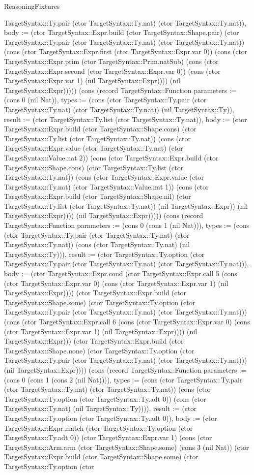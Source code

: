 \begin{lexlean}{ReasoningFixtures}
\begin{semanticmodule}
{TargetSyntax::Ty.pair (ctor TargetSyntax::Ty.nat) (ctor TargetSyntax::Ty.nat)), body := (ctor TargetSyntax::Expr.build (ctor TargetSyntax::Shape.pair) (ctor TargetSyntax::Ty.pair (ctor TargetSyntax::Ty.nat) (ctor TargetSyntax::Ty.nat)) (cons (ctor TargetSyntax::Expr.first (ctor TargetSyntax::Expr.var 0)) (cons (ctor TargetSyntax::Expr.prim (ctor TargetSyntax::Prim.natSub) (cons (ctor TargetSyntax::Expr.second (ctor TargetSyntax::Expr.var 0)) (cons (ctor TargetSyntax::Expr.var 1) (nil TargetSyntax::Expr)))) (nil TargetSyntax::Expr))))}) (cons (record TargetSyntax::Function {parameters := (cons 0 (nil Nat)), types := (cons (ctor TargetSyntax::Ty.pair (ctor TargetSyntax::Ty.nat) (ctor TargetSyntax::Ty.nat)) (nil TargetSyntax::Ty)), result := (ctor TargetSyntax::Ty.list (ctor TargetSyntax::Ty.nat)), body := (ctor TargetSyntax::Expr.build (ctor TargetSyntax::Shape.cons) (ctor TargetSyntax::Ty.list (ctor TargetSyntax::Ty.nat)) (cons (ctor TargetSyntax::Expr.value (ctor TargetSyntax::Ty.nat) (ctor TargetSyntax::Value.nat 2)) (cons (ctor TargetSyntax::Expr.build (ctor TargetSyntax::Shape.cons) (ctor TargetSyntax::Ty.list (ctor TargetSyntax::Ty.nat)) (cons (ctor TargetSyntax::Expr.value (ctor TargetSyntax::Ty.nat) (ctor TargetSyntax::Value.nat 1)) (cons (ctor TargetSyntax::Expr.build (ctor TargetSyntax::Shape.nil) (ctor TargetSyntax::Ty.list (ctor TargetSyntax::Ty.nat)) (nil TargetSyntax::Expr)) (nil TargetSyntax::Expr)))) (nil TargetSyntax::Expr))))}) (cons (record TargetSyntax::Function {parameters := (cons 0 (cons 1 (nil Nat))), types := (cons (ctor TargetSyntax::Ty.pair (ctor TargetSyntax::Ty.nat) (ctor TargetSyntax::Ty.nat)) (cons (ctor TargetSyntax::Ty.nat) (nil TargetSyntax::Ty))), result := (ctor TargetSyntax::Ty.option (ctor TargetSyntax::Ty.pair (ctor TargetSyntax::Ty.nat) (ctor TargetSyntax::Ty.nat))), body := (ctor TargetSyntax::Expr.cond (ctor TargetSyntax::Expr.call 5 (cons (ctor TargetSyntax::Expr.var 0) (cons (ctor TargetSyntax::Expr.var 1) (nil TargetSyntax::Expr)))) (ctor TargetSyntax::Expr.build (ctor TargetSyntax::Shape.some) (ctor TargetSyntax::Ty.option (ctor TargetSyntax::Ty.pair (ctor TargetSyntax::Ty.nat) (ctor TargetSyntax::Ty.nat))) (cons (ctor TargetSyntax::Expr.call 6 (cons (ctor TargetSyntax::Expr.var 0) (cons (ctor TargetSyntax::Expr.var 1) (nil TargetSyntax::Expr)))) (nil TargetSyntax::Expr))) (ctor TargetSyntax::Expr.build (ctor TargetSyntax::Shape.none) (ctor TargetSyntax::Ty.option (ctor TargetSyntax::Ty.pair (ctor TargetSyntax::Ty.nat) (ctor TargetSyntax::Ty.nat))) (nil TargetSyntax::Expr)))}) (cons (record TargetSyntax::Function {parameters := (cons 0 (cons 1 (cons 2 (nil Nat)))), types := (cons (ctor TargetSyntax::Ty.pair (ctor TargetSyntax::Ty.nat) (ctor TargetSyntax::Ty.nat)) (cons (ctor TargetSyntax::Ty.option (ctor TargetSyntax::Ty.adt 0)) (cons (ctor TargetSyntax::Ty.nat) (nil TargetSyntax::Ty)))), result := (ctor TargetSyntax::Ty.option (ctor TargetSyntax::Ty.adt 0)), body := (ctor TargetSyntax::Expr.match (ctor TargetSyntax::Ty.option (ctor TargetSyntax::Ty.adt 0)) (ctor TargetSyntax::Expr.var 1) (cons (ctor TargetSyntax::Arm.arm (ctor TargetSyntax::Shape.some) (cons 3 (nil Nat)) (ctor TargetSyntax::Expr.build (ctor TargetSyntax::Shape.some) (ctor TargetSyntax::Ty.option (ctor }
\end{semanticmodule}
\end{lexlean}
